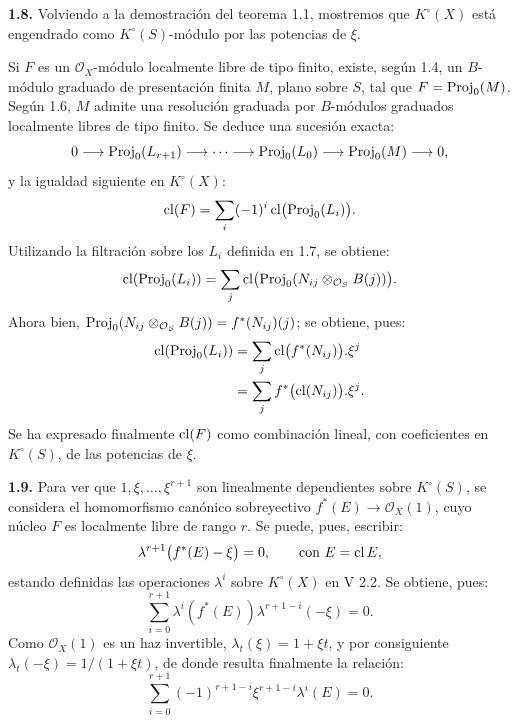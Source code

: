 \providecommand{\sisi}[2]{#2}

\textbf{1.8.} Volviendo a la demostración del teorema 1.1, mostremos que \(K^\circ(X)\) está engendrado como \(K^\circ(S)\)-módulo por las potencias de \(\xi\).

Si \(F\) es un \(\mathcal O_X\)-módulo localmente libre de tipo finito, existe, según 1.4, un \(B\)-módulo graduado de presentación finita \(M\), plano sobre \(S\), tal que \(F=\operatorname{Proj}_0(M)\). Según 1.6, \(M\) admite una resolución graduada por \(B\)-módulos graduados localmente libres de tipo finito. Se deduce una sucesión exacta:
\[
  0\longrightarrow \operatorname{Proj}_0(L_{r+1})\longrightarrow\cdots\longrightarrow
  \operatorname{Proj}_0(L_0)\longrightarrow\operatorname{Proj}_0(M)\longrightarrow 0,
\]
y la igualdad siguiente en \(K^\circ(X)\):
\[
  \operatorname{cl}(F)=\sum_i(-1)^i\operatorname{cl}\bigl(\operatorname{Proj}_0(L_i)\bigr).
\]
Utilizando la filtración sobre los \(L_i\) definida en 1.7, se obtiene:
\[
  \operatorname{cl}(\operatorname{Proj}_0(L_i))=\sum_j \operatorname{cl}\bigl(\operatorname{Proj}_0(N_{ij}\otimes_{\mathcal O_S}B(j))\bigr).
\]
Ahora bien, \(\operatorname{Proj}_0(N_{ij}\otimes_{\mathcal O_S}B(j))=f^*(N_{ij})(j)\); se obtiene, pues:
\[
\begin{aligned}
  \operatorname{cl}(\operatorname{Proj}_0(L_i))
  &=\sum_j \operatorname{cl}\bigl(f^*(N_{ij})\bigr).\xi^j \\
  &=\sum_j f^*\bigl(\operatorname{cl}(N_{ij})\bigr).\xi^j.
\end{aligned}
\]
Se ha expresado finalmente \(\operatorname{cl}(F)\) como combinación lineal, con coeficientes en \(K^\circ(S)\), de las potencias de \(\xi\).

\textbf{1.9.} Para ver que \(1,\xi,\ldots,\xi^{r+1}\) son linealmente dependientes sobre \(K^\circ(S)\), se considera el homomorfismo canónico sobreyectivo \(f^*(E)\to\mathcal O_X(1)\), cuyo núcleo \(F\) es localmente libre de rango \(r\). Se puede, pues, escribir:
\[
  \lambda^{r+1}\bigl(f^*(E)-\xi\bigr)=0,
  \qquad \text{con } E=\operatorname{cl} E,
\]
estando definidas las operaciones \(\lambda^i\) sobre \(K^\circ(X)\) en V 2.2. Se obtiene, pues:
\[
  \sum_{i=0}^{r+1}\lambda^i(f^*(E))\lambda^{r+1-i}(-\xi)=0.
\]
Como \(\mathcal O_X(1)\) es un haz invertible, \(\lambda_t(\xi)=1+\xi t\), y por consiguiente \(\lambda_t(-\xi)=1/(1+\xi t)\), de donde resulta finalmente la relación:
\begin{equation}\tag{1.9.1}
  \sum_{i=0}^{r+1}(-1)^{r+1-i}\xi^{r+1-i}\lambda^i(E)=0.
\end{equation}

